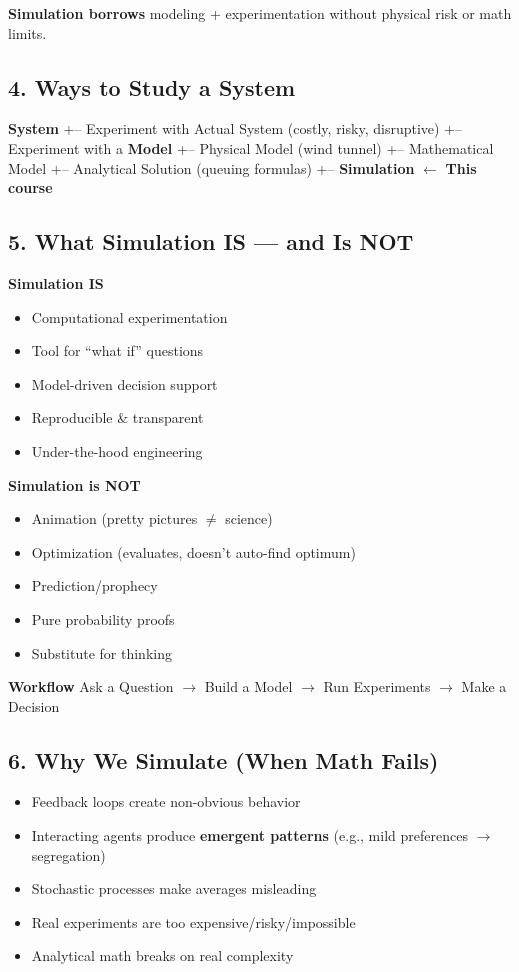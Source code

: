 \documentclass[11pt]{article}
\begin{document}
\textbf{Simulation borrows} modeling + experimentation without physical risk or math limits.

\subsection*{4. Ways to Study a System}
\textbf{System}
+-- Experiment with Actual System (costly, risky, disruptive)  
+-- Experiment with a \textbf{Model}  
  +-- Physical Model (wind tunnel)  
  +-- Mathematical Model  
    +-- Analytical Solution (queuing formulas)  
    +-- \textbf{Simulation} $\leftarrow$ \textbf{This course}

\subsection*{5. What Simulation IS --- and Is NOT}
\textbf{Simulation IS}
\begin{itemize}[leftmargin=*]
\item Computational experimentation  
\item Tool for ``what if'' questions  
\item Model-driven decision support  
\item Reproducible \& transparent  
\item Under-the-hood engineering
\end{itemize}

\textbf{Simulation is NOT}
\begin{itemize}[leftmargin=*]
\item Animation (pretty pictures $\neq$ science)  
\item Optimization (evaluates, doesn't auto-find optimum)  
\item Prediction/prophecy  
\item Pure probability proofs  
\item Substitute for thinking
\end{itemize}

\textbf{Workflow}
Ask a Question $\rightarrow$ Build a Model $\rightarrow$ Run Experiments $\rightarrow$ Make a Decision

\subsection*{6. Why We Simulate (When Math Fails)}
\begin{itemize}[leftmargin=*]
\item Feedback loops create non-obvious behavior  
\item Interacting agents produce \textbf{emergent patterns} (e.g., mild preferences $\rightarrow$ segregation)  
\item Stochastic processes make averages misleading  
\item Real experiments are too expensive/risky/impossible  
\item Analytical math breaks on real complexity
\end{itemize}
\end{document}
